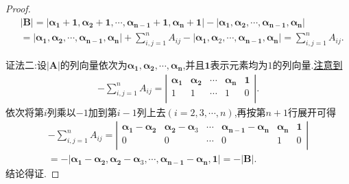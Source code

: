 \documentclass[../../main.tex]{subfiles}%
\begin{document}
\begin{proof}
\begin{align*}
&|\boldsymbol{B}| = |\boldsymbol{\alpha}_{\boldsymbol{1}} + \mathbf{1},\boldsymbol{\alpha}_{\boldsymbol{2}} + \mathbf{1},\cdots,\boldsymbol{\alpha}_{\boldsymbol{n-1}} + \mathbf{1},\boldsymbol{\alpha}_{\boldsymbol{n}} + \mathbf{1}| - |\boldsymbol{\alpha}_{\boldsymbol{1}},\boldsymbol{\alpha}_{\boldsymbol{2}},\cdots,\boldsymbol{\alpha}_{\boldsymbol{n-1}},\boldsymbol{\alpha}_{\boldsymbol{n}}|
\\
&= |\boldsymbol{\alpha}_{\boldsymbol{1}},\boldsymbol{\alpha}_{\boldsymbol{2}},\cdots,\boldsymbol{\alpha}_{\boldsymbol{n-1}},\boldsymbol{\alpha}_{\boldsymbol{n}}| + \sum_{i,j = 1}^{n}A_{ij} - |\boldsymbol{\alpha}_{\boldsymbol{1}},\boldsymbol{\alpha}_2,\cdots,\boldsymbol{\alpha}_{\boldsymbol{n-1}},\boldsymbol{\alpha}_{\boldsymbol{n}}| = \sum_{i,j = 1}^{n}A_{ij}.
\end{align*}

{\color{blue}证法二:}设\(|\boldsymbol{A}|\)的列向量依次为\(\boldsymbol{\alpha}_{\boldsymbol{1}},\boldsymbol{\alpha}_{\boldsymbol{2}},\cdots,\boldsymbol{\alpha}_{\boldsymbol{n}}\),并且\(\mathbf{1}\)表示元素均为\(1\)的列向量.\hyperref[关于行列式|A|所有代数余子式求和的构造]{注意到}
\begin{align*}
-\sum_{i,j=1}^n{A_{ij}}=\left| \begin{matrix}
\boldsymbol{\alpha }_{\mathbf{1}}&		\boldsymbol{\alpha }_{\mathbf{2}}&		\cdots&		\boldsymbol{\alpha }_{\boldsymbol{n}}&		\mathbf{1}\\
1&		1&		\cdots&		1&		0\\
\end{matrix} \right|.
\end{align*}
依次将第$i$列乘以$-1$加到第$i-1$列上去$(i=2,3,\cdots,n)$,再按第$n+1$行展开可得
\begin{align*}
-\sum_{i,j=1}^n{A_{ij}=\left| \begin{matrix}
\boldsymbol{\alpha }_{\mathbf{1}}-\boldsymbol{\alpha }_{\mathbf{2}}&		\boldsymbol{\alpha }_{\mathbf{2}}-\boldsymbol{\alpha }_{3}&		\cdots&		\boldsymbol{\alpha }_{\boldsymbol{n}-\mathbf{1}}-\boldsymbol{\alpha }_{\boldsymbol{n}}&		\boldsymbol{\alpha }_{\boldsymbol{n}}&		\mathbf{1}\\
0&		0&		\cdots&		0&		1&		0\\
\end{matrix} \right|}
\\
=-|\boldsymbol{\alpha }_{\mathbf{1}}-\boldsymbol{\alpha }_{\mathbf{2}},\boldsymbol{\alpha }_{\mathbf{2}}-\boldsymbol{\alpha }_{3},\cdots ,\boldsymbol{\alpha }_{\boldsymbol{n}-\mathbf{1}}-\boldsymbol{\alpha }_{\boldsymbol{n}},\mathbf{1}|=-|\boldsymbol{B}|.
\end{align*}
结论得证.

\end{proof}
\end{document}
